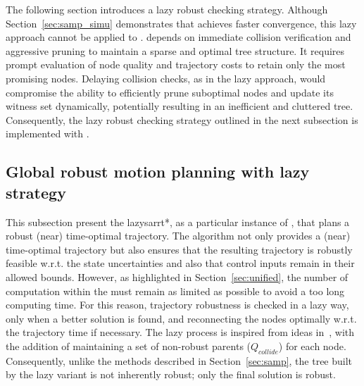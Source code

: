 The following section introduces a lazy robust checking strategy. 
Although Section~\ref{sec:samp_simu} demonstrates that  achieves faster convergence, this lazy approach cannot be applied to . 
 depends on immediate collision verification and aggressive pruning to maintain a sparse and optimal tree structure. 
It requires prompt evaluation of node quality and trajectory costs to retain only the most promising nodes.
Delaying collision checks, as in the lazy approach, would compromise the  ability to efficiently prune suboptimal nodes and update its witness set dynamically, potentially resulting in an inefficient and cluttered tree. 
Consequently, the lazy robust checking strategy outlined in the next subsection is implemented with .

\subsection{Global robust motion planning with lazy strategy}\label{sec:lazy_rrt*}

This subsection present the \gls{lazysarrt*}, as a particular instance of , that plans a robust (near) time-optimal trajectory.
The algorithm not only provides a (near) time-optimal trajectory but also ensures that the resulting trajectory is robustly feasible w.r.t. the state uncertainties and also that control inputs remain in their allowed bounds.
However, as highlighted in Section~\ref{sec:unified}, the number of  computation within the  must remain as limited as possible to avoid a too long computing time. 
For this reason, trajectory robustness is checked in a lazy way, only when a better solution is found, and reconnecting the nodes optimally w.r.t. the trajectory time if necessary.
The lazy process is inspired from ideas in~\cite{cLazy1,cLazy2}, with the addition of maintaining a set of non-robust parents ($Q_{collide}$) for each node.
Consequently, unlike the  methods described in Section~\ref{sec:samp}, the tree built by the lazy variant is not inherently robust; only the final solution is robust.

